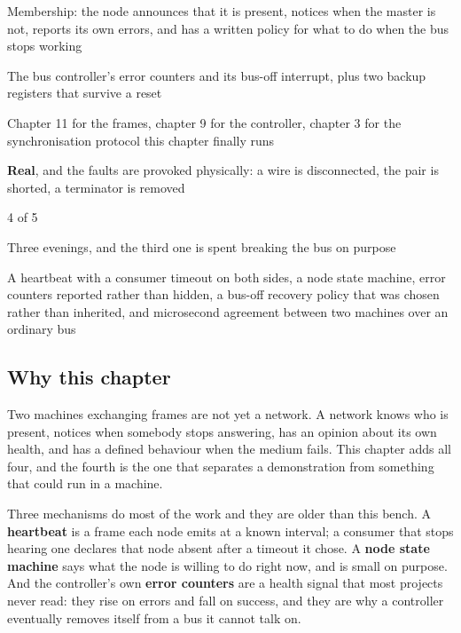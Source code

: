 
\begin{keyfacts}
\item[Adds to the node] Membership: the node announces that it is present, notices when the master is not, reports its own errors, and has a written policy for what to do when the bus stops working
\item[Peripherals] The bus controller's error counters and its bus-off interrupt, plus two backup registers that survive a reset
\item[Depends on] Chapter 11 for the frames, chapter 9 for the controller, chapter 3 for the synchronisation protocol this chapter finally runs
\item[Real or modelled] \textbf{Real}, and the faults are provoked physically: a wire is disconnected, the pair is shorted, a terminator is removed
\item[Difficulty] 4 of 5
\item[Effort] Three evenings, and the third one is spent breaking the bus on purpose
\item[Deliverable] A heartbeat with a consumer timeout on both sides, a node state machine, error counters reported rather than hidden, a bus-off recovery policy that was chosen rather than inherited, and microsecond agreement between two machines over an ordinary bus
\end{keyfacts}

\subsection*{Why this chapter}

Two machines exchanging frames are not yet a network. A network knows who is
present, notices when somebody stops answering, has an opinion about its own
health, and has a defined behaviour when the medium fails. This chapter adds all
four, and the fourth is the one that separates a demonstration from something
that could run in a machine.

Three mechanisms do most of the work and they are older than this bench. A
\textbf{heartbeat} is a frame each node emits at a known interval; a consumer
that stops hearing one declares that node absent after a timeout it chose. A
\textbf{node state machine} says what the node is willing to do right now, and
is small on purpose. And the controller's own \textbf{error counters} are a
health signal that most projects never read: they rise on errors and fall on
success, and they are why a controller eventually removes itself from a bus it
cannot talk on.

